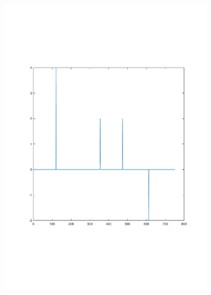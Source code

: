 \documentclass[sigconf]{acmart}
\begin{document}
\begin{figure}[!htp]
\begin{subfigure}[t]{0.4\linewidth}
		\includegraphics[width=0.95\linewidth, trim={100 100 0 0}, clip]{fig/route_change_20}
		\label{fig:3.2b}
	\end{subfigure}
	\begin{subfigure}[t]{0.4\linewidth}
		\centering

\end{subfigure}
\end{figure}
\end{document}

